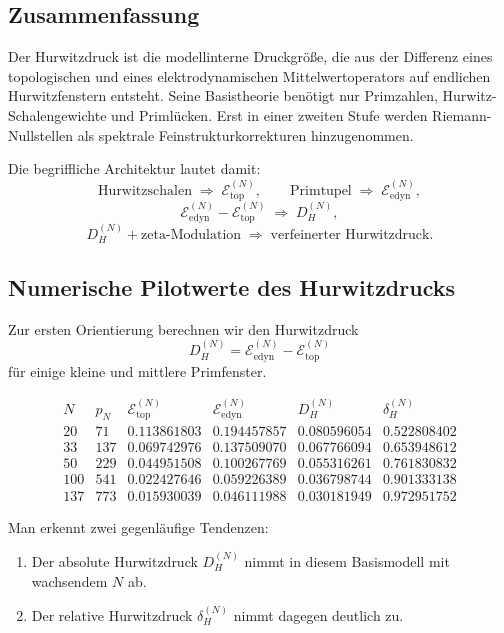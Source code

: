 \documentclass[12pt,a4paper]{article}
\theoremstyle{definition}
\begin{document}
	\subsection{Zusammenfassung}
	
	Der Hurwitzdruck ist die modellinterne Druckgröße, die aus der Differenz eines topologischen und eines elektrodynamischen Mittelwertoperators auf endlichen Hurwitzfenstern entsteht. Seine Basistheorie benötigt nur Primzahlen, Hurwitz-Schalengewichte und Primlücken. Erst in einer zweiten Stufe werden Riemann-Nullstellen als spektrale Feinstrukturkorrekturen hinzugenommen.
	
	Die begriffliche Architektur lautet damit:
	\[
	\text{Hurwitzschalen}
	\;\Longrightarrow\;
	\mathcal{E}_{\mathrm{top}}^{(N)},
	\qquad
	\text{Primtupel}
	\;\Longrightarrow\;
	\mathcal{E}_{\mathrm{edyn}}^{(N)},
	\]
	\[
	\mathcal{E}_{\mathrm{edyn}}^{(N)}-\mathcal{E}_{\mathrm{top}}^{(N)}
	\;\Longrightarrow\;
	D_H^{(N)},
	\]
	\[
	D_H^{(N)} + \text{zeta-Modulation}
	\;\Longrightarrow\;
	\text{verfeinerter Hurwitzdruck}.
	\]
	
	\subsection{Numerische Pilotwerte des Hurwitzdrucks}
	
	Zur ersten Orientierung berechnen wir den Hurwitzdruck
	\[
	D_H^{(N)}
	=
	\mathcal{E}_{\mathrm{edyn}}^{(N)}-\mathcal{E}_{\mathrm{top}}^{(N)}
	\]
	für einige kleine und mittlere Primfenster.
	
	\[
	\begin{array}{r|r|r|r|r|r}
		N & p_N & \mathcal E_{\mathrm{top}}^{(N)} & \mathcal E_{\mathrm{edyn}}^{(N)} & D_H^{(N)} & \delta_H^{(N)} \\
		\hline
		20  & 71  & 0.113861803 & 0.194457857 & 0.080596054 & 0.522808402 \\
		33  & 137 & 0.069742976 & 0.137509070 & 0.067766094 & 0.653948612 \\
		50  & 229 & 0.044951508 & 0.100267769 & 0.055316261 & 0.761830832 \\
		100 & 541 & 0.022427646 & 0.059226389 & 0.036798744 & 0.901333138 \\
		137 & 773 & 0.015930039 & 0.046111988 & 0.030181949 & 0.972951752
	\end{array}
	\]
	
	Man erkennt zwei gegenläufige Tendenzen:
	
	\begin{enumerate}
		\item Der absolute Hurwitzdruck \(D_H^{(N)}\) nimmt in diesem Basismodell mit wachsendem \(N\) ab.
		\item Der relative Hurwitzdruck \(\delta_H^{(N)}\) nimmt dagegen deutlich zu.
	\end{enumerate}
	
\end{document}

